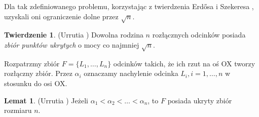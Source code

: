 \documentclass[brudnopis]{xmgr}
\theoremstyle{definition}
\newtheorem{Twierdzenie}{Twierdzenie}
\newtheorem{Lemat}{Lemat}
\begin{document}
Dla tak zdefiniowanego problemu, korzystając z twierdzenia Erd{\H o}sa i Szekeresa \cite{erdosszekeres}, uzyskali oni ograniczenie dolne przez $\sqrt{n}$.

\begin{Twierdzenie}\label{moc zbioru ukrytego tw} (Urrutia \cite{illumination})
  Dowolna rodzina $n$ rozłącznych odcinków posiada \emph{zbiór punktów ukrytych} o mocy co najmniej $\sqrt{n}$.
\end{Twierdzenie}

Rozpatrzmy zbiór $F = \{L_1,\ldots,L_n\}$ odcinków takich, że ich rzut na oś OX tworzy rozłączny zbiór. Przez $\alpha_i$ oznaczamy nachylenie odcinka $L_i, i = 1,\ldots,n$ w stosunku do osi OX.
\begin{Lemat}\label{zbior ukryty} (Urrutia \cite{illumination})
  Jeżeli $\alpha_1 < \alpha_2 < \ldots < \alpha_n$, to $F$ posiada ukryty zbiór rozmiaru $n$.
\end{Lemat}
\end{document}
